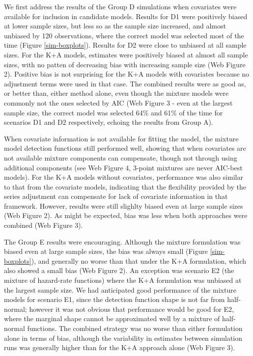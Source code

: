 \documentclass[authoryear,preprint,review,12pt]{elsarticle}
\begin{document}
We first address the results of the Group D simulations when covariates were available for inclusion in candidate models. Results for D1 were positively biased at lower sample sizes, but less so as the sample size increased, and almost unbiased by 120 observations, where the correct model was selected most of the time (Figure \ref{sim-boxplots}).  Results for D2 were close to unbiased at all sample sizes.  For the K+A models, estimates were positively biased at almost all sample sizes, with no patten of decreasing bias with increasing sample size (Web Figure 2).  Positive bias is not surprising for the K+A models with covariates because no adjustment terms were used in that case.  The combined results were as good as, or better than, either method alone, even though the mixture models were commonly not the ones selected by AIC (Web Figure 3 - even at the largest sample size, the correct model was selected 64\% and 61\% of the time for scenarios D1 and D2 respectively, echoing the results from Group A). 

When covariate information is not available for fitting the model, the mixture model detection functions still performed well, showing that when covariates are not available mixture components can compensate, though not through using additional components (see Web Figure 4, 3-point mixtures are never AIC-best models).  For the K+A models without covariates, performance was also similar to that from the covariate models, indicating that the flexibility provided by the series adjustment can compensate for lack of covariate information in that framework.  However, results were still slighlty biased even at large sample sizes (Web Figure 2).  As might be expected, bias was less when both approaches were combined (Web Figure 3).

The Group E results were encouraging.  Although the mixture formulation was biased even at large sample sizes, the bias was always small (Figure \ref{sim-boxplots}), and generally no worse than that under the K+A formulation, which also showed a small bias (Web Figure 2).  An exception was scenario E2 (the mixture of hazard-rate functions) where the K+A formulation was unbiased at the largest sample size.  We had anticipated good performance of the mixture models for scenario E1, since the detection function shape is not far from half-normal; however it was not obvious that performance would be good for E2, where the marginal shape cannot be approximated well by a mixture of half-normal functions.  The combined strategy was no worse than either formulation alone in terms of bias, although the variability in estimates between simulation runs was generally higher than for the K+A approach alone (Web Figure 3).  
\end{document}
